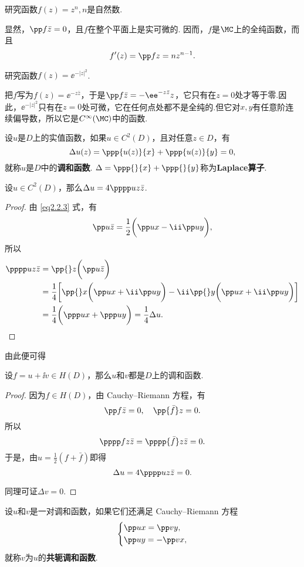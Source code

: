 \begin{example}
研究函数$f(z)=z^n,n$是自然数.
\end{example}
\begin{solution}
  显然，$\pp f{\bar z}=0$，且$f$在整个平面上是实可微的. 因而，$f$是$\MC$上的全纯函数，而且
  \[f'(z)=\pp fz=nz^{n-1}.\]
\end{solution}

\begin{example}
研究函数$f(z)=\ee^{-|z|^2}$.
\end{example}
\begin{solution}
把$f$写为$f(z)=\ee^{-z\bar z}$，于是$\pp f{\bar z}=-\ee^{-z\bar z}z$，它只有在$z=0$处才等于零.因此，$\ee^{-|z|^2}$只有在$z=0$处可微，它在任何点处都不是全纯的.但它对$x,y$有任意阶连续偏导数，所以它是$C^\infty(\MC)$中的函数.
\end{solution}

\begin{definition}\label{def2.2.7}
  设$u$是$D$上的实值函数，如果$u\in C^2(D)$，且对任意$z\in D$，有
  \[\Delta u(z)=\ppp{u(z)}{x}+\ppp{u(z)}{y}=0,\]
就称$u$是$D$中的\textbf{调和函数}. $\Delta =\ppp{}{x}+\ppp{}{y}$称为\textbf{Laplace算子}.
\end{definition}

\begin{prop}\label{prop2.2.8}
设$u\in C^2(D)$，那么$\Delta u=4\pppp uz{\bar z}$.
\end{prop}
\begin{proof}
由 \eqref{eq2.2.3} 式，有
\[\pp u{\bar z}=\frac12\bigg(\pp ux-\ii\pp uy\bigg),\]
所以
\begin{align*}
\pppp uz{\bar z}&=\pp {}z\bigg(\pp u{\bar z}\bigg)\\
&=\frac14\bigg[\pp{}x\bigg(\pp ux+\ii \pp uy\bigg)-\ii\pp{}y\bigg(\pp ux+\ii\pp uy\bigg)\bigg]\\
&=\frac14\bigg(\ppp ux+\ppp uy\bigg)=\frac14\Delta u.
\end{align*}
\end{proof}

由此便可得
\begin{theorem}\label{thm2.2.9}
  设$f=u+\ii v\in H(D)$，那么$u$和$v$都是$D$上的调和函数.
\end{theorem}
\begin{proof}
因为$f\in H(D)$，由 Cauchy--Riemann 方程，有
\[\pp f{\bar z}=0,\quad \pp{\bar f}z=0.\]
所以
\[\pppp fz{\bar z}=\pppp{\bar f}z{\bar z}=0.\]
于是，由$u=\frac12(f+\bar f)$即得
\[\Delta u=4\pppp uz{\bar z}=0.\]

同理可证$\Delta v=0$.
\end{proof}
\begin{definition}\label{def2.2.10}
设$u$和$v$是一对调和函数，如果它们还满足 Cauchy--Riemann 方程
\[\left\{\begin{aligned}
&\pp ux=\pp vy,\\
&\pp uy=-\pp vx,
\end{aligned}\right.\]
就称$v$为$u$的\textbf{共轭调和函数}.
\end{definition}

